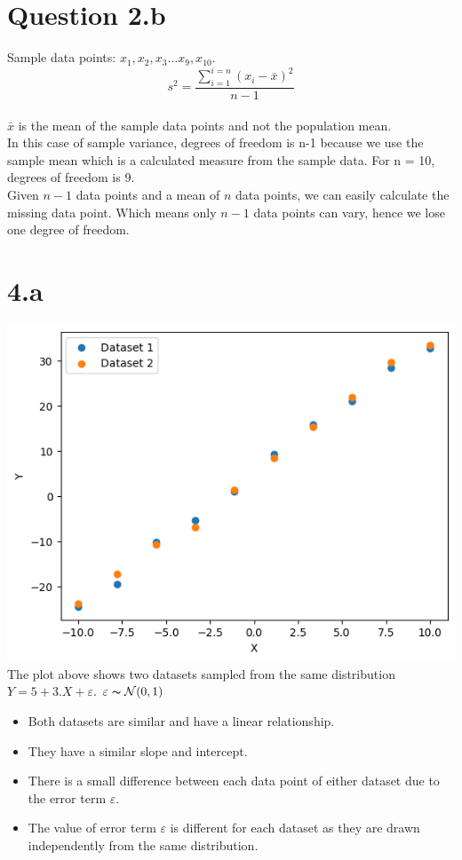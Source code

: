 \documentclass[12pt]{article}
\begin{document}
\section*{Question 2.b}
Sample data points: \(x_1, x_2, x_3 \dots x_9, x_{10}\).
\\
\[s^2 = \frac{\sum_{i=1}^{i=n}(x_i - \bar{x})^2}{n-1}\]
\\
\(\bar{x}\) is the mean of the sample data points and not the population mean.
\\[\baselineskip]
In this case of sample variance, degrees of freedom is n-1 because we use the
sample mean which is a calculated measure from the sample data.
For n = 10, degrees of freedom is 9.
\\[\baselineskip]
Given \(n-1\) data points and a mean of \(n\) data points, we can easily calculate the
missing data point. Which means only \(n-1\) data points can vary, hence we lose
one degree of freedom.

\newpage
\section*{4.a}
\includegraphics*{graph4a}
\\
The plot above shows two datasets sampled from the same distribution
\(Y = 5 + 3.X + \varepsilon\). \(\varepsilon \thicksim \mathcal{N}(0, 1)\)
\\
\begin{itemize}
    \item Both datasets are similar and have a linear relationship.
    \item They have a similar slope and intercept.
    \item There is a small difference between each data point of either dataset
    due to the error term \(\varepsilon\).
    \item The value of error term \(\varepsilon\) is different for each dataset
    as they are drawn independently from the same distribution.
\end{itemize}
\end{document}
